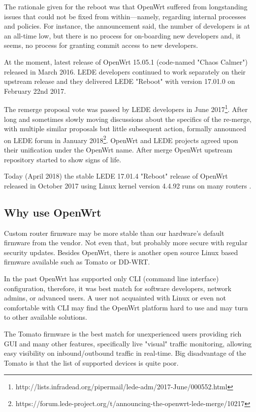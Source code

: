 The rationale given for the reboot was that OpenWrt suffered from longstanding issues that could not be fixed from within—namely, regarding internal processes and policies.
For instance, the announcement said, the number of developers is at an all-time low, but there is no process for on-boarding new developers and, it seems, no process for granting commit access to new developers.

At the moment, latest release of OpenWrt 15.05.1 (code-named "Chaos Calmer") released in March 2016.
LEDE developers continued to work separately on their upstream release and they delivered LEDE "Reboot" with version 17.01.0 on February 22nd 2017.

The remerge proposal vote was passed by LEDE developers in June 2017\footnote{http://lists.infradead.org/pipermail/lede-adm/2017-June/000552.html}.
After long and sometimes slowly moving discussions about the specifics of the re-merge, with multiple similar proposals but little subsequent action, formally announced on LEDE forum in January 2018\footnote{https://forum.lede-project.org/t/announcing-the-openwrt-lede-merge/10217}. %
OpenWrt and LEDE projects agreed upon their unification under the OpenWrt name.
After merge OpenWrt upstream repository started to show signs of life.

Today (April 2018) the stable LEDE 17.01.4 "Reboot" release of OpenWrt released in October 2017 using Linux kernel version 4.4.92 runs on many routers \cite{lede_release}.



\subsection{Why use OpenWrt}

Custom router firmware may be more stable than our hardware’s default firmware from the vendor.
Not even that, but probably more secure with regular security updates.
Besides OpenWrt, there is another open source Linux based firmware available such as Tomato or DD-WRT. %

In the past OpenWrt has supported only CLI (command line interface) configuration, therefore, it was best match for software developers, network admins, or advanced users.
A user not acquainted with Linux or even not comfortable with CLI may find the OpenWrt platform hard to use and may turn to other available solutions. %

The Tomato firmware is the best match for unexperienced users providing rich GUI and many other features, specifically live "visual" traffic monitoring, allowing easy visibility on inbound/outbound traffic in real-time.
Big disadvantage of the Tomato is that the list of supported devices is quite poor.

